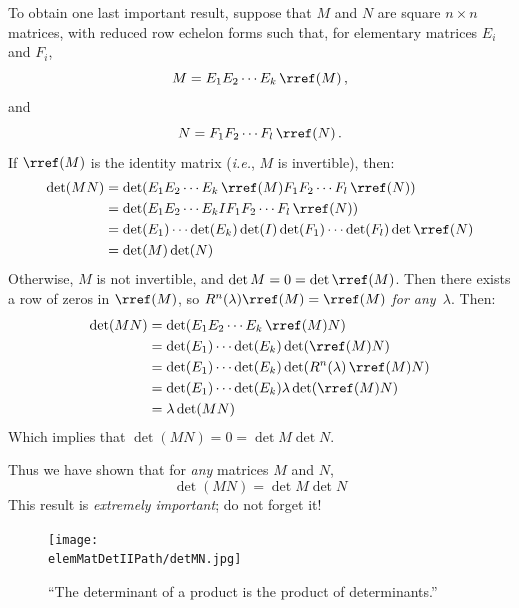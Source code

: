 To obtain one last important result, suppose that $M$ and $N$ are square $n\times n$ matrices, with reduced row echelon forms such that, for elementary matrices  $E_i$ and $F_i$, \[M=E_1E_2\cdots E_k \, \rref(M)\, ,\] and  \[N=F_1F_2\cdots F_l \, \rref(N)\, .\]  If $\rref(M)$ is the identity matrix ({\itshape i.e.}, $M$ is invertible), then:
\begin{align*}
\det (MN) & = \det (E_1E_2\cdots E_k\,  \rref(M) F_1F_2\cdots F_l \, \rref(N) )\\
& = \det (E_1E_2\cdots E_k I F_1F_2\cdots F_l\,  \rref(N) )\\
& = \det (E_1) \cdots \det(E_k)\det(I)\det(F_1)\cdots\det(F_l)\det\rref(N)\\
& = \det(M)\det(N)
\end{align*}
Otherwise, $M$ is not invertible, and $\det M=0=\det 
\rref(M)$.  Then there exists a row of zeros in $
\rref(M)$, so $R^n(\lambda)
\rref(M)=
\rref(M)$ {\itshape for any~$\lambda$}.  Then:
\begin{align*}
\det (MN)
& = \det (E_1E_2\cdots E_k \, \rref(M) N )\\
& = \det (E_1) \cdots \det(E_k)\det( \rref(M)N)\\
& = \det (E_1) \cdots \det(E_k)\det( R^n(\lambda) \, \rref(M)N)\\
& = \det (E_1) \cdots \det(E_k)\lambda \det( \rref(M)N)\\
& = \lambda \det (MN)
\end{align*}
Which implies that $\det (MN)=0=\det M \det N$.

Thus we have shown that for {\itshape any} matrices $M$ and $N$, 
\label{detmultiplicative}
\[
\det (MN) = \det M \det N
\]
This result is {\itshape extremely important}; do not forget it!


\begin{figure}
\begin{center}
\texttt{[image: \\elemMatDetIIPath/detMN.jpg]}
\end{center}
\caption{``The determinant of a product is the product of determinants.''}
\end{figure}






